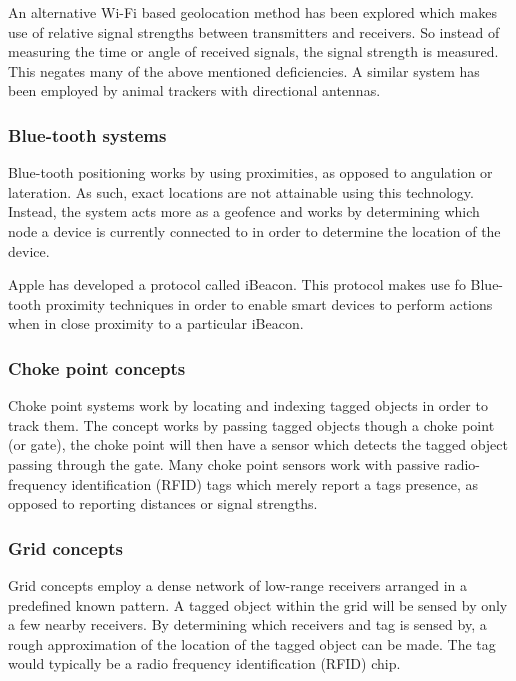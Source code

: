 \documentclass[11pt,a4paper]{report}
\begin{document}
			An alternative Wi-Fi based geolocation method has been explored which makes use of relative signal strengths between transmitters and receivers. So instead of measuring the time or angle of received signals, the signal strength is measured. This negates many of the above mentioned deficiencies. A similar system has been employed by animal trackers with directional antennas.
			\cite{yongguang_chen_signal_2002}
	
		\subsubsection{Blue-tooth systems}
			Blue-tooth positioning works by using proximities, as opposed to angulation or lateration. As such, exact locations are not attainable using this technology. Instead, the system acts more as a geofence and works by determining which node a device is currently connected to in order to determine the location of the device.
		
			Apple has developed a protocol called iBeacon. This protocol makes use fo Blue-tooth proximity techniques in order to enable smart devices to perform actions when in close proximity to a particular iBeacon.
			\cite{_everything_????}
		
		\subsubsection{Choke point concepts}
			Choke point systems work by locating and indexing tagged objects in order to track them. The concept works by passing tagged objects though a choke point (or gate), the choke point will then have a sensor which detects the tagged object passing through the gate. Many choke point sensors work with passive radio-frequency identification (RFID) tags which merely report a tags presence, as opposed to reporting distances or signal strengths.
			\cite{reza_investigation_2008}
		
		\subsubsection{Grid concepts}
			Grid concepts employ a dense network of low-range receivers arranged in a predefined known pattern. A tagged object within the grid will be sensed by only a few nearby receivers. By determining which receivers and tag is sensed by, a rough approximation of the location of the tagged object can be made. The tag would typically be a radio frequency identification (RFID) chip.
		
\end{document}
